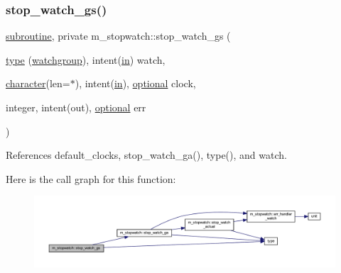 \subsubsection{\texorpdfstring{stop\+\_\+watch\+\_\+gs()}{stop\_watch\_gs()}}
{\footnotesize\ttfamily \hyperlink{M__stopwatch_83_8txt_acfbcff50169d691ff02d4a123ed70482}{subroutine}, private m\+\_\+stopwatch\+::stop\+\_\+watch\+\_\+gs (\begin{DoxyParamCaption}\item[{\hyperlink{stop__watch_83_8txt_a70f0ead91c32e25323c03265aa302c1c}{type} (\hyperlink{structm__stopwatch_1_1watchgroup}{watchgroup}), intent(\hyperlink{M__journal_83_8txt_afce72651d1eed785a2132bee863b2f38}{in})}]{watch,  }\item[{\hyperlink{option__stopwatch_83_8txt_abd4b21fbbd175834027b5224bfe97e66}{character}(len=$\ast$), intent(\hyperlink{M__journal_83_8txt_afce72651d1eed785a2132bee863b2f38}{in}), \hyperlink{option__stopwatch_83_8txt_aa4ece75e7acf58a4843f70fe18c3ade5}{optional}}]{clock,  }\item[{integer, intent(out), \hyperlink{option__stopwatch_83_8txt_aa4ece75e7acf58a4843f70fe18c3ade5}{optional}}]{err }\end{DoxyParamCaption})\hspace{0.3cm}{\ttfamily [private]}}



References default\+\_\+clocks, stop\+\_\+watch\+\_\+ga(), type(), and watch.

Here is the call graph for this function\+:
\nopagebreak
\begin{figure}[H]
\begin{center}
\leavevmode
\includegraphics[width=350pt]{namespacem__stopwatch_afc518d20fded06c7da4a9eba0df5e41a_cgraph}
\end{center}
\end{figure}
\mbox{\label{namespacem__stopwatch_a7486f3bc54b8bf0313f595151927a56c}} 

